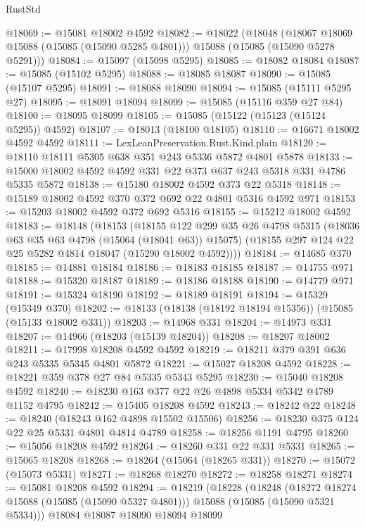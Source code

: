 \begin{lexlean}{RustStd}
\begin{coremodule}
@18069 := @15081 @18002 @4592
@18082 := @18022
    (@18048
      (@18067 @18069 @15088 (@15085 (@15090 @5285 @4801)))
      @15088
      (@15085 (@15090 @5278 @5291)))
@18084 := @15097 (@15098 @5295)
@18085 := @18082 @18084
@18087 := @15085 (@15102 @5295)
@18088 := @18085 @18087
@18090 := @15085 (@15107 @5295)
@18091 := @18088 @18090
@18094 := @15085 (@15111 @5295 @27)
@18095 := @18091 @18094
@18099 := @15085 (@15116 @359 @27 @84)
@18100 := @18095 @18099
@18105 := @15085 (@15122 (@15123 (@15124 @5295)) @4592)
@18107 := @18013 (@18100 @18105)
@18110 := @16671 @18002 @4592 @4592
@18111 := LexLeanPreservation.Rust.Kind.plain
@18120 := @18110 @18111 @5305 @638 @351 @243 @5336 @5872 @4801 @5878
@18133 := @15000 @18002 @4592 @4592 @331 @22 @373 @637 @243 @5318 @331 @4786 @5335 @5872
@18138 := @15180 @18002 @4592 @373 @22 @5318
@18148 := @15189 @18002 @4592 @370 @372 @692 @22 @4801 @5316 @4592 @971
@18153 := @15203 @18002 @4592 @372 @692 @5316
@18155 := @15212 @18002 @4592
@18183 := @18148
    (@18153
      (@18155
        @122
        @299
        @35
        @26
        @4798
        @5315
        (@18036 @63 @35 @63 @4798 (@15064 (@18041 @63)) @15075)
        (@18155 @297 @124 @22 @25 @5282 @4814 @18047 (@15290 @18002 @4592))))
@18184 := @14685 @370
@18185 := @14881 @18184
@18186 := @18183 @18185
@18187 := @14755 @971
@18188 := @15320 @18187
@18189 := @18186 @18188
@18190 := @14779 @971
@18191 := @15324 @18190
@18192 := @18189 @18191
@18194 := @15329 (@15349 @370)
@18202 := @18133 (@18138 (@18192 @18194 @15356)) (@15085 (@15133 @18002 @331))
@18203 := @14968 @331
@18204 := @14973 @331
@18207 := @14966 (@18203 (@15139 @18204))
@18208 := @18207 @18002
@18211 := @17998 @18208 @4592 @4592
@18219 := @18211 @379 @391 @636 @243 @5335 @5345 @4801 @5872
@18221 := @15027 @18208 @4592
@18228 := @18221 @359 @378 @27 @84 @5335 @5343 @5295
@18230 := @15040 @18208 @4592
@18240 := @18230 @163 @377 @22 @26 @4898 @5334 @5342 @4789 @1152 @4795
@18242 := @15405 @18208 @4592
@18243 := @18242 @22
@18248 := @18240 (@18243 @162 @4898 @15502 @15506)
@18256 := @18230 @375 @124 @22 @25 @5331 @4801 @4814 @4789
@18258 := @18256 @1191 @4795
@18260 := @15056 @18208 @4592
@18264 := @18260 @331 @22 @331 @5331
@18265 := @15065 @18208
@18268 := @18264 (@15064 (@18265 @331))
@18270 := @15072 (@15073 @5331)
@18271 := @18268 @18270
@18272 := @18258 @18271
@18274 := @15081 @18208 @4592
@18294 := @18219
    (@18228
      (@18248
        (@18272 @18274 @15088 (@15085 (@15090 @5327 @4801)))
        @15088
        (@15085 (@15090 @5321 @5334)))
      @18084
      @18087
      @18090
      @18094
      @18099

\end{coremodule}
\end{lexlean}
